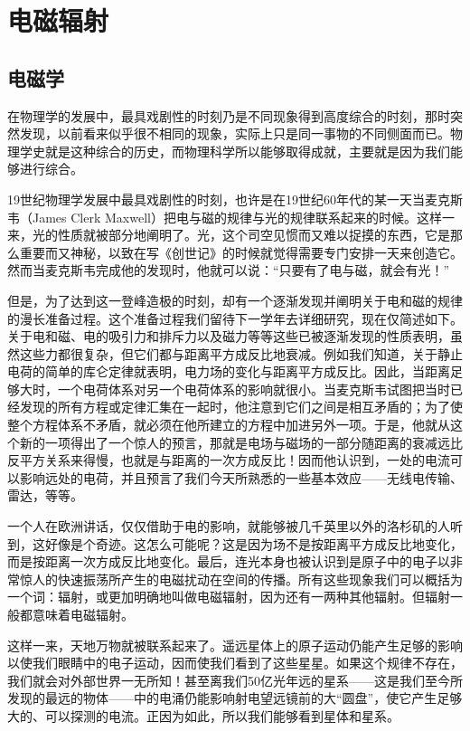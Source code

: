 \chapter{电磁辐射}

\section{电磁学}

在物理学的发展中，最具戏剧性的时刻乃是不同现象得到高度综合的时刻，那时突然发现，以前看来似乎很不相同的现象，实际上只是同一事物的不同侧面而已。物理学史就是这种综合的历史，而物理科学所以能够取得成就，主要就是因为我们能够进行综合。

19世纪物理学发展中最具戏剧性的时刻，也许是在19世纪60年代的某一天当麦克斯韦（James Clerk Maxwell）把电与磁的规律与光的规律联系起来的时候。这样一来，光的性质就被部分地阐明了。光，这个司空见惯而又难以捉摸的东西，它是那么重要而又神秘，以致在写《创世记》的时候就觉得需要专门安排一天来创造它。然而当麦克斯韦完成他的发现时，他就可以说：“只要有了电与磁，就会有光！”

但是，为了达到这一登峰造极的时刻，却有一个逐渐发现并阐明关于电和磁的规律的漫长准备过程。这个准备过程我们留待下一学年去详细研究，现在仅简述如下。关于电和磁、电的吸引力和排斥力以及磁力等等这些已被逐渐发现的性质表明，虽然这些力都很复杂，但它们都与距离平方成反比地衰减。例如我们知道，关于静止电荷的简单的库仑定律就表明，电力场的变化与距离平方成反比。因此，当距离足够大时，一个电荷体系对另一个电荷体系的影响就很小。当麦克斯韦试图把当时已经发现的所有方程或定律汇集在一起时，他注意到它们之间是相互矛盾的；为了使整个方程体系不矛盾，就必须在他所建立的方程中加进另外一项。于是，他就从这个新的一项得出了一个惊人的预言，那就是电场与磁场的一部分随距离的衰减远比反平方关系来得慢，也就是与距离的一次方成反比！因而他认识到，一处的电流可以影响远处的电荷，并且预言了我们今天所熟悉的一些基本效应——无线电传输、雷达，等等。

一个人在欧洲讲话，仅仅借助于电的影响，就能够被几千英里以外的洛杉矶的人听到，这好像是个奇迹。这怎么可能呢？这是因为场不是按距离平方成反比地变化，而是按距离一次方成反比地变化。最后，连光本身也被认识到是原子中的电子以非常惊人的快速振荡所产生的电磁扰动在空间的传播。所有这些现象我们可以概括为一个词：辐射，或更加明确地叫做电磁辐射，因为还有一两种其他辐射。但辐射一般都意味着电磁辐射。

这样一来，天地万物就被联系起来了。遥远星体上的原子运动仍能产生足够的影响以使我们眼睛中的电子运动，因而使我们看到了这些星星。如果这个规律不存在，我们就会对外部世界一无所知！甚至离我们50亿光年远的星系——这是我们至今所发现的最远的物体——中的电涌仍能影响射电望远镜前的大“圆盘”，使它产生足够大的、可以探测的电流。正因为如此，所以我们能够看到星体和星系。

